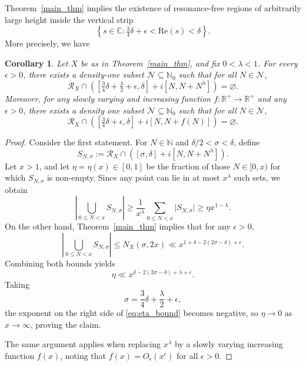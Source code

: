 \documentclass[12pt,letterpaper]{amsart}
\theoremstyle{plain}
\newtheorem{cor}[prop]{Corollary}
\theoremstyle{definition}
\theoremstyle{remark}
\newcommand{\CC}{\mathbb{C}}
\begin{document}
Theorem~\ref{main_thm} implies the existence of resonance-free regions of arbitrarily large height inside the vertical strip
\[
\left\{ s \in \CC : \tfrac{3}{4}\delta + \epsilon < \mathrm{Re}(s) < \delta \right\}.
\]
More precisely, we have

\begin{cor}
Let $X$ be as in Theorem~\ref{main_thm}, and fix $0 < \lambda < 1$. For every $\epsilon > 0$, there exists a density-one subset $\mathcal{N} \subseteq \mathbb{N}_0$ such that for all $N \in \mathcal{N}$,
\[
\mathcal{R}_X \cap \left( \left[\tfrac{3}{4} \delta + \tfrac{\lambda}{2} + \epsilon, \delta\right] + i[N, N + N^\lambda] \right) = \varnothing.
\]
Moreover, for any slowly varying and increasing function $f \colon \mathbb{R}^+ \to \mathbb{R}^+$ and any $\epsilon > 0$, there exists a density one subset $\mathcal{N} \subseteq \mathbb{N}_0$ such that for all $N \in \mathcal{N}$,
\[
\mathcal{R}_X \cap \left( \left[\tfrac{3}{4} \delta + \epsilon, \delta\right] + i[N, N + f(N)] \right) = \varnothing.
\]
\end{cor}

\begin{proof}
Consider the first statement. For $N \in \mathbb{N}$ and $\delta/2<\sigma < \delta$, define
\[
S_{N,\sigma} := \mathcal{R}_X \cap \left( [\sigma, \delta] + i[N, N + N^\lambda] \right).
\]
Let $x>1$, and let $\eta=\eta(x) \in [0,1]$ be the fraction of those $N \in [0, x)$ for which $S_{N,\sigma}$ is non-empty. Since any point can lie in at most $x^\lambda$ such sets, we obtain
\[
\left\vert \bigcup_{0 \le N < x} S_{N,\sigma} \right\vert \ge \frac{1}{x^\lambda} \sum_{0 \le N < x} \vert S_{N,\sigma} \vert \ge \eta x^{1 - \lambda}.
\]
On the other hand, Theorem~\ref{main_thm} implies that for any $\epsilon > 0$,
\[
\left\vert \bigcup_{0 \le N < x} S_{N,\sigma} \right\vert \le N_X(\sigma, 2x) \ll x^{1 + \delta - 2(2\sigma - \delta) + \epsilon}.
\]
Combining both bounds yields
\begin{equation}\label{eq:eta_bound}
\eta \ll x^{\delta - 2(2\sigma - \delta) + \lambda + \epsilon}.
\end{equation}
Taking
\[
\sigma = \frac{3}{4} \delta  + \frac{\lambda}{2} + \epsilon,
\]
the exponent on the right side of \eqref{eq:eta_bound} becomes negative, so $\eta \to 0$ as $x \to \infty$, proving the claim.

The same argument applies when replacing $x^\lambda$ by a slowly varying increasing function $f(x)$, noting that $f(x) = O_\epsilon(x^\epsilon)$ for all $\epsilon > 0$.
\end{proof}
\end{document}
